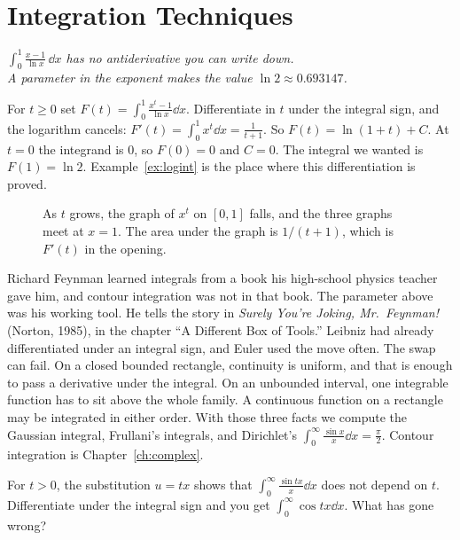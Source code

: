 \chapter{Integration Techniques}\label{ch:integrals}

\begin{center}\itshape
$\displaystyle\int_0^1\frac{x-1}{\ln x}\,\dd x$ has no antiderivative you can write down.\\
A parameter in the exponent makes the value $\ln 2\approx 0.693147$.
\end{center}

For $t\ge0$ set $F(t)=\int_0^1\frac{x^t-1}{\ln x}\dd x$. Differentiate in $t$ under the integral sign, and the logarithm cancels: $F'(t)=\int_0^1 x^t\dd x=\frac1{t+1}$. So $F(t)=\ln(1+t)+C$. At $t=0$ the integrand is $0$, so $F(0)=0$ and $C=0$. The integral we wanted is $F(1)=\ln 2$. Example~\ref{ex:logint} is the place where this differentiation is proved.

\begin{figure}[ht]
\centering
{}
\caption{As $t$ grows, the graph of $x^t$ on $[0,1]$ falls, and the three graphs meet at $x=1$. The area under the graph is $1/(t+1)$, which is $F'(t)$ in the opening.}
\label{fig:rw04-param}
\end{figure}

Richard Feynman learned integrals from a book his high-school physics teacher gave him, and contour integration was not in that book. The parameter above was his working tool. He tells the story in \emph{Surely You're Joking, Mr.~Feynman!} (Norton, 1985), in the chapter ``A Different Box of Tools.'' Leibniz had already differentiated under an integral sign, and Euler used the move often. The swap can fail. On a closed bounded rectangle, continuity is uniform, and that is enough to pass a derivative under the integral. On an unbounded interval, one integrable function has to sit above the whole family. A continuous function on a rectangle may be integrated in either order. With those three facts we compute the Gaussian integral, Frullani's integrals, and Dirichlet's $\int_0^\infty\frac{\sin x}x\dd x=\frac\pi2$. Contour integration is Chapter~\ref{ch:complex}.

\begin{think}
For $t>0$, the substitution $u=tx$ shows that $\int_0^\infty\frac{\sin tx}x\dd x$ does not depend on $t$. Differentiate
under the integral sign and you get $\int_0^\infty\cos tx\dd x$. What has gone wrong?
\end{think}

